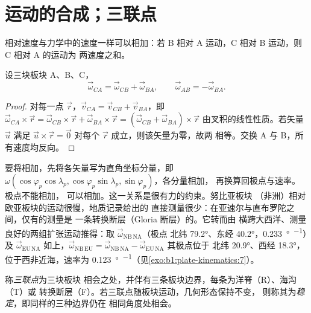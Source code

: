 \section{运动的合成；三联点}

相对速度与力学中的速度一样可以相加：若 B 相对
A 运动，C 相对 B 运动，则 C 相对 A 的运动为
两速度之和。

\begin{proposition}[欧拉矢量可加]\label{prop:b1:plate-kinematics:addition}
设三块板块 A、B、C，
\[
  \vec\omega_{CA} = \vec\omega_{CB} + \vec\omega_{BA}, \qquad
  \vec\omega_{AB} = -\vec\omega_{BA}.
\]
\end{proposition}

\begin{proof}
对每一点 $\vec r$，$\vec v_{CA} = \vec v_{CB} + \vec v_{BA}$，即
$\vec\omega_{CA}\times\vec r = \vec\omega_{CB}\times\vec r +
\vec\omega_{BA}\times\vec r = (\vec\omega_{CB} + \vec\omega_{BA})\times\vec r$
由叉积的线性性质。若矢量 $\vec u$ 满足
$\vec u\times\vec r = \vec 0$ 对每个 $\vec r$ 成立，则该矢量为零，故两
相等。交换 A 与 B，所有速度均反向。
\end{proof}

要将相加，先将各矢量写为直角坐标分量，即 $\omega(\cos\varphi_p
\cos\lambda_p, \cos\varphi_p\sin\lambda_p, \sin\varphi_p)$，各分量相加，
再换算回极点与速率。极点不能相加，
可以相加。这一关系是很有力的约束。努比亚板块
（非洲）相对欧亚板块的运动很慢，地质记录给出的
直接测量很少：在亚速尔与直布罗陀之间，仅有的测量是
一条转换断层（Gloria 断层）的。它转而由
横跨大西洋、测量良好的两组扩张运动推得：取 $\vec\omega_{\mathrm{NB\,NA}}$（极点
北纬 \ang{79.2}、东经 \ang{40.2}，\qty{0.233}{\degree\per\Ma}）及
$\vec\omega_{\mathrm{EU\,NA}}$ 如上，$\vec\omega_{\mathrm{NB\,EU}} =
\vec\omega_{\mathrm{NB\,NA}} - \vec\omega_{\mathrm{EU\,NA}}$ 其极点位于
北纬 \ang{20.9}、西经 \ang{18.3}，位于西非近海，速率为
\qty{0.123}{\degree\per\Ma}（见\cref{exo:b1:plate-kinematics:7}）。

\begin{definition}\label{def:b1:plate-kinematics:triple-junction}
称\emph{三联点}为三块板块
相会之处，并伴有三条板块边界，每条为洋脊（R）、海沟（T）或
转换断层（F）。若三联点随板块运动，几何形态保持不变，
则称其为\emph{稳定}，即同样的三种边界仍在
相同角度处相会。
\end{definition}

